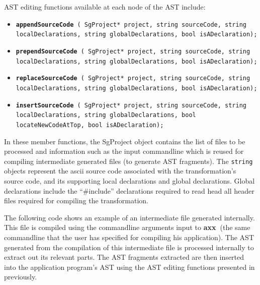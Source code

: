 \documentclass[10pt]{article}
\newcommand{\axx}{{\bf axx\ }}
\begin{document}
AST editing functions available at each node of the AST include:
\begin{itemize}
    \item {\tt {\bf appendSourceCode} ( SgProject* project, string sourceCode, 
                             string localDeclarations, string globalDeclarations, bool isADeclaration);}
    \item {\tt {\bf prependSourceCode} ( SgProject* project, string sourceCode, 
                             string localDeclarations, string globalDeclarations, bool isADeclaration);}
    \item {\tt {\bf replaceSourceCode} ( SgProject* project, string sourceCode, 
                             string localDeclarations, string globalDeclarations, bool isADeclaration);}
    \item {\tt {\bf insertSourceCode} ( SgProject* project, string sourceCode, 
                             string localDeclarations, string globalDeclarations, bool locateNewCodeAtTop, bool isADeclaration);}
\end{itemize}

   In these member functions, the SgProject object contains the list of files to be processed and
information such as the input commandline which is reused for compiling intermediate generated files
(to generate AST fragments).  The {\tt string} objects represent the ascii source code associated with the
transformation's source code, and its supporting local declarations and global declarations.  Global declarations
include the ``\#include'' declarations required to read head all header files required for compiling the transformation.

The following code shows an example of an intermediate file generated internally.  This file is compiled using the 
commandline arguments input to \axx (the same commandline that the user has specified for compiling his application).
The AST generated from the compilation of this intermediate file is processed internally to extract out its relevant parts.
The AST fragments extracted are then inserted into the application program's AST using the AST editing functions presented in 
previously.
\end{document}

